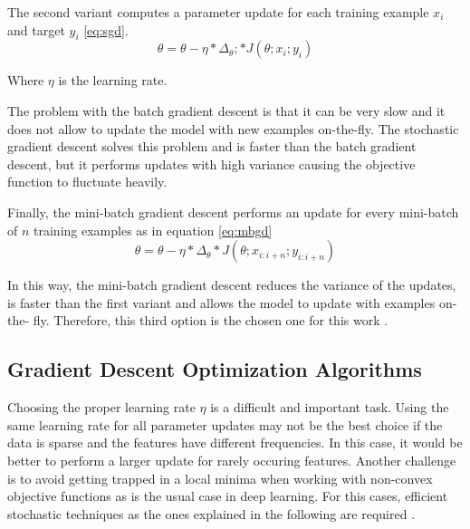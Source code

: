 The second variant computes a parameter update for each training example $x_i$ and target $y_i$ \ref{eq:sgd}.
\begin{equation} \label{eq:sgd}
\theta=\theta-\eta * \Delta_\theta; * J(\theta;x_i;y_i)
\end{equation}

Where $\eta$ is the learning rate.

The problem with the batch gradient descent is that it can be very slow and it does not allow to update the model with new examples on-the-fly. The stochastic gradient descent solves this problem and is faster than the batch gradient descent, but it performs updates with high variance causing the objective function to fluctuate heavily.  

Finally, the mini-batch gradient descent performs an update for every mini-batch of $n$ training examples as in equation \ref{eq:mbgd} \begin{equation} \label{eq:mbgd}
\theta=\theta-\eta * \Delta_\theta * J(\theta;x_{i:i+n};y_{i:i+n})
\end{equation}

In this way, the mini-batch gradient descent reduces the variance of the updates, is faster than the first variant and allows the model to update with examples on-the- fly. Therefore, this third option is the chosen one for this work \cite{ruder2016overview}. 

\subsection{Gradient Descent Optimization Algorithms}
Choosing the proper learning rate $\eta$ is a difficult and important task. Using the same learning rate for all parameter updates may not be the best choice if the data is sparse and the features have different frequencies. In this case, it would be better to perform a larger update for rarely occuring features. Another challenge is to avoid getting trapped in a local minima when working with non-convex objective functions as is the usual case in deep learning. For this cases, efficient stochastic techniques as the ones explained in the following are required \cite{ruder2016overview}.

